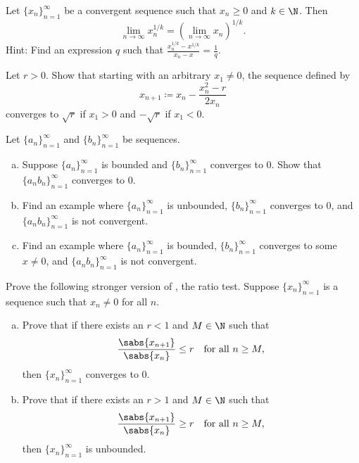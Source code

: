 \begin{exercise}[Challenging]
Let $\{ x_n \}_{n=1}^\infty$ be a convergent sequence such
that $x_n \geq 0$ and $k \in \N$.
Then
\begin{equation*}
\lim_{n\to\infty} x_n^{1/k} =
{\left( \lim_{n\to\infty} x_n \right)}^{1/k} .
\end{equation*}
Hint: Find an expression $q$ such that $\frac{x_n^{1/k}-x^{1/k}}{x_n-x} =
\frac{1}{q}$.
\end{exercise}

\begin{exercise}
Let $r > 0$.  Show that starting with an arbitrary $x_1 \not= 0$, the sequence
defined by
\begin{equation*}
x_{n+1} \coloneqq x_n - \frac{x_n^2-r}{2x_n}
\end{equation*}
converges to $\sqrt{r}$ if $x_1 > 0$ and $-\sqrt{r}$ if $x_1 < 0$.
\end{exercise}

\begin{samepage}
\begin{exercise}
Let $\{ a_n \}_{n=1}^\infty$ and $\{ b_n \}_{n=1}^\infty$ be sequences.
\begin{enumerate}[a)]
\item
Suppose $\{ a_n \}_{n=1}^\infty$ is bounded and $\{ b_n \}_{n=1}^\infty$ converges to 0.
Show that $\{ a_n b_n \}_{n=1}^\infty$ converges to 0.
\item
Find an example where $\{ a_n \}_{n=1}^\infty$ is unbounded, $\{ b_n \}_{n=1}^\infty$ converges to
0, and $\{ a_n b_n \}_{n=1}^\infty$ is not convergent.
\item
Find an example where $\{ a_n \}_{n=1}^\infty$ is bounded, $\{ b_n \}_{n=1}^\infty$ converges to
some $x \not= 0$, and $\{ a_n b_n \}_{n=1}^\infty$ is not convergent.
\end{enumerate}
\end{exercise}
\end{samepage}

\begin{samepage}
\begin{exercise}[Easy] \label{exercise:strongerratiotest1}
Prove the following stronger version of , the ratio
test.  
Suppose $\{ x_n \}_{n=1}^\infty$ is a sequence such that $x_n \not= 0$ for all
$n$.
\begin{enumerate}[a)]
\item
Prove that if there exists an $r < 1$ and $M \in \N$ such that
\begin{equation*}
\frac{\sabs{x_{n+1}}}{\sabs{x_n}} \leq r \quad \text{for all } n \geq M,
\end{equation*}
then $\{ x_n \}_{n=1}^\infty$ converges to $0$.
\item
Prove that if there exists an $r > 1$ and $M \in \N$ such that
\begin{equation*}
\frac{\sabs{x_{n+1}}}{\sabs{x_n}} \geq r  \quad \text{for all } n \geq M,
\end{equation*}
then $\{ x_n \}_{n=1}^\infty$ is unbounded.
\end{enumerate}
\end{exercise}
\end{samepage}

